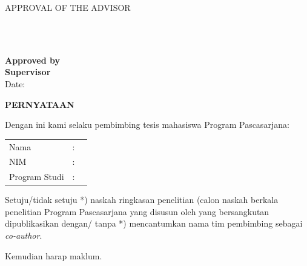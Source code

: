 \newpage
\begin{singlespace}
\begin{center}
\large{APPROVAL OF THE ADVISOR} \\

\vspace{2.5cm}
\normalfont\@titleeng \par\nobreak

\vspace{5cm}
\underline{\@fullname} \\
\@idnum \\
\end{center}

\vspace{4cm}
\noindent
\textbf{Approved by} \\
\textbf{Supervisor} \\

\vspace{1.5cm}
\noindent
\textbf{\underline{\@firstsupervisor}} \hfill Date: \@dateapprove  \\
\textbf{\@firstsupervisornip}
\end{singlespace}

\newpage
\onehalfspacing
{}
\begin{center}
{\normalfont\large\bfseries\expandafter{PERNYATAAN}}
\par\nobreak
\end{center}

\vspace{1.0cm}
\noindent
Dengan ini kami selaku pembimbing tesis mahasiswa Program Pascasarjana: \\

\renewcommand{\arraystretch}{1.2}
\noindent
\begin{tabular}{p{2.5cm}p{0.01cm}p{5cm}}
Nama 			& : &\@fullname \\
NIM				& : &\@idnum \\
Program Studi	& : &\@program 
\end{tabular}

\vspace{0.3cm}
\noindent
\onehalfspacing
Setuju/tidak setuju *) naskah ringkasan penelitian (calon naskah berkala penelitian Program Pascasarjana yang disusun oleh yang bersangkutan dipublikasikan dengan/ tanpa *) mencantumkan  nama tim pembimbing sebagai \textit{co-author}.

\vspace{.3cm}
\noindent
Kemudian harap maklum.

